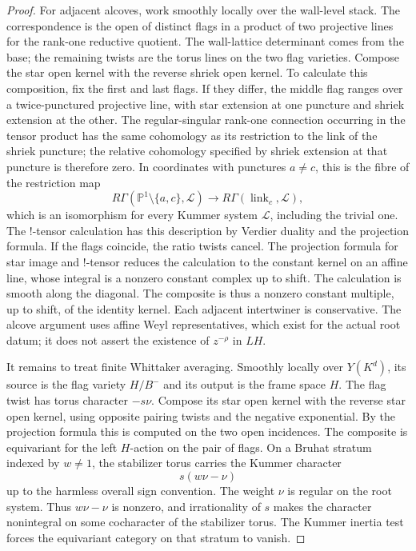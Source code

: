 \documentclass[11pt]{article}
\numberwithin{equation}{section}
\theoremstyle{definition}
\theoremstyle{remark}
\begin{document}
\begin{proof}
For adjacent alcoves, work smoothly locally over the wall-level stack.
The correspondence is the open of distinct flags in a product of two
projective lines for the rank-one reductive quotient.  The wall-lattice
determinant comes from the base; the remaining twists are the torus lines
on the two flag varieties.  Compose the star open kernel with the
reverse shriek open kernel.  To calculate this composition, fix the
first and last flags.  If they differ, the middle flag ranges over a
twice-punctured projective line, with star extension at one puncture and
shriek extension at the other.  The regular-singular rank-one
connection occurring in the tensor product has the same cohomology as
its restriction to the link of the shriek puncture; the relative
cohomology specified by shriek extension at that puncture is
therefore zero.  In coordinates with punctures $a\ne c$, this is the
fibre of the restriction map
\[
 R\Gamma(\mathbb P^1\setminus\{a,c\},\mathcal L)
       \longrightarrow R\Gamma(\operatorname{link}_c,\mathcal L),
\]
which is an isomorphism for every Kummer system $\mathcal L$, including
the trivial one.  The $!$-tensor calculation has this description by
Verdier duality and the projection formula.  If the flags coincide,
the ratio twists cancel.  The
projection formula for star image and $!$-tensor reduces the calculation
to the constant kernel on an affine line, whose integral is a nonzero
constant complex up to shift.  The calculation is smooth along the
diagonal.  The composite is thus a nonzero constant multiple, up to
shift, of the identity kernel.  Each adjacent intertwiner is
conservative.  The alcove argument uses affine Weyl representatives,
which exist for the actual root datum; it does not assert the existence
of $z^{-\rho}$ in $LH$.

It remains to treat finite Whittaker averaging.  Smoothly locally over
$Y(K^d)$, its source is the flag variety $H/B^-$ and its output is the
frame space $H$.  The flag twist has torus character $-s\nu$.
Compose its star open kernel with the reverse star open kernel, using
opposite pairing twists and the negative exponential.  By the
projection formula this is computed on the two open incidences.
The composite is equivariant for the left $H$-action on the pair of
flags.  On a Bruhat stratum indexed by $w\ne1$, the stabilizer torus
carries the Kummer character
\[
 s(w\nu-\nu)
\]
up to the harmless overall sign convention.  The weight $\nu$ is regular
on the root system.  Thus $w\nu-\nu$ is nonzero, and irrationality of
$s$ makes the character nonintegral on some cocharacter of the
stabilizer torus.  The Kummer inertia test forces the equivariant
category on that stratum to vanish.


\end{proof}
\end{document}
